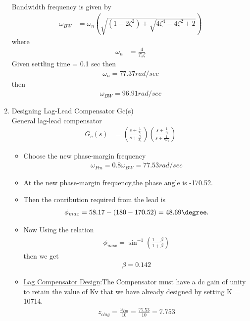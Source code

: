 \begin{enumerate}[label=\thesubsection.\arabic*.,ref=\thesubsection.\theenumi]
Bandwidth frequency is given by\\
\begin{align}
\omega_{BW} &= \omega_{n}(\sqrt{(1-2\zeta^2)+\sqrt{4\zeta^4-4\zeta^2+2}})
\end{align}
where
\begin{align}
    \omega_{n}&=\frac{4}{T_{s}\zeta}
\end{align}
Given settling time = 0.1 sec then 
\begin{align}
    \omega_{n} = 77.37 rad/sec 
\end{align}
then
\begin{align}
    \omega_{BW} = 96.91 rad/sec
\end{align}

\item 
Designing Lag-Lead Compensator Gc(s)
\\
\solution 
General lag-lead compensator 
\begin{align}
G_{c}(s) &= \left(\frac{s+\frac{1}{T_1}}{s+\frac{\gamma}{T_1}}\right)\left(\frac{s+\frac{1}{T_2}}{s+\frac{1}{\gamma T_2}}\right) 
\end{align}
\begin{itemize}
\item Choose the new phase-margin frequency 
\begin{align}
    \omega_{Pm} = 0.8\omega_{BW} = 77.53 rad/sec
\end{align}
\item At the new phase-margin frequency,the phase angle is -170.52\degree.
\item Then the conribution required from the lead is
\begin{align}
    \phi_{max} = 58.17-(180-170.52)=48.69\degree.
\end{align}
\item Now Using the relation 
\begin{align}
    \phi_{max} = \sin^{-1}(\frac{1-\beta}{1+\beta})
\end{align}
then we get
\begin{align}
    \beta=0.142
\end{align}
\item \underline{Lag Compensator Design}:The Compensator must have a dc gain of unity to retain the value of Kv that we have already designed by setting K = 10714.
\begin{align}
    z_{clag}=\frac{\omega_{Pm}}{10}=\frac{77.53}{10}=7.753
\end{align}
\begin{align}

\end{align}
\end{itemize}
\end{enumerate}
